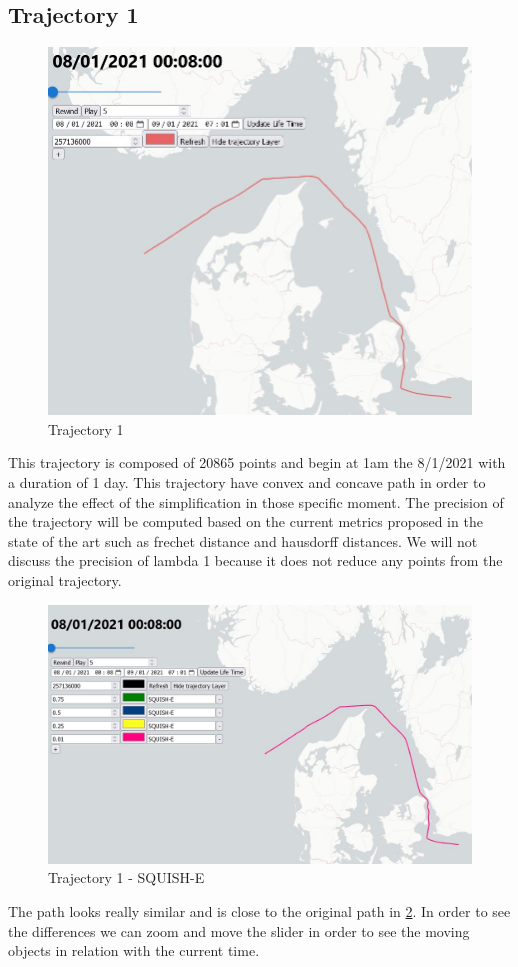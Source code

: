 \subsection{Trajectory 1}

\begin{figure}[!h]
    \centering
    \includegraphics[width=0.5\linewidth]{figures/Stats/traj_1.jpg}
    \caption{Trajectory 1}
    \label{fig:traj_1}
\end{figure}

This trajectory is composed of 20865 points and begin at 1am the 8/1/2021 with a duration of 1 day. This trajectory have convex and concave path in order to analyze the effect of the simplification in those specific moment. The precision of the trajectory will be computed based on the current metrics proposed in the state of the art such as frechet distance and hausdorff distances. We will not discuss the precision of lambda 1 because it does not reduce any points from the original trajectory.



\begin{figure}[!h]
    \centering
    \includegraphics[width=0.5\linewidth]{figures/Stats/squish_1.jpg}
    \caption{Trajectory 1 - SQUISH-E}
    \label{fig:traj_1_squish}
\end{figure}

The path looks really similar and is close to the original path in \ref{fig:traj_1_squish}. In order to see the differences we can zoom and move the slider in order to see the moving objects in relation with the current time.

